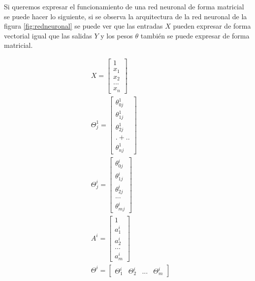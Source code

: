 \par Si queremos expresar el funcionamiento de una red neuronal de forma matricial se puede hacer lo siguiente, si se observa la arquitectura de la red neuronal de la figura \ref{fig:redneuronal} se puede ver que las entradas $X$ pueden expresar de forma vectorial igual que las salidas $Y$ y los pesos $\theta$ también se puede expresar de forma matricial.
\begin{spreadlines}{10pt}
	\begin{alignat}{4}
		\label{eq:1}
		 & X=\begin{bmatrix}
			1     \\
			x_{1} \\
			x_{2} \\
			...   \\
			x_{n}
		\end{bmatrix}                \\  \label{eq:2}
		 & \Theta ^{1}_{j} =\begin{bmatrix}
			\theta ^{1}_{0j} \\
			\theta ^{1}_{1j} \\
			\theta ^{1}_{2j} \\
			.+..             \\
			\theta ^{1}_{nj}
		\end{bmatrix} \\ \label{eq:3}
		 & \Theta ^{i}_{j} =\begin{bmatrix}
			\theta ^{i}_{0j} \\
			\theta ^{i}_{1j} \\
			\theta ^{i}_{2j} \\
			...              \\
			\theta ^{i}_{mj}
		\end{bmatrix} \\ \label{eq:4}
		 & A^{i} =\begin{bmatrix}
			1         \\
			a^{i}_{1} \\
			a^{i}_{2} \\
			...       \\
			a^{i}_{m}
		\end{bmatrix}           \\
		 & \Theta ^{i} =\begin{bmatrix}
			\Theta ^{i}_{1} & \Theta ^{i}_{2} & ... & \Theta ^{i}_{m}\end{bmatrix}
	\end{alignat}
\end{spreadlines}

